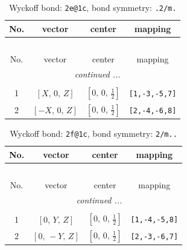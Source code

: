 \documentclass[fleqn,8pt]{jsarticle}
\begin{document}
\renewcommand{\arraystretch}{1.2}
\begin{longtable}{cccc}
\caption{Wyckoff bond: {\tt 2e@1c}, bond symmetry: {\tt .2/m.}}
 \\
 \hline \hline
No. & vector & center & mapping \\ \hline \endfirsthead

\multicolumn{3}{l}{\tablename\ \thetable{}} \\
 \hline \hline
No. & vector & center & mapping \\ \hline \endhead

 \hline \hline
\multicolumn{3}{r}{\footnotesize\it continued ...} \\ \endfoot

 \hline \hline
\multicolumn{3}{r}{} \\ \endlastfoot

1 & $\left[ X,\, 0,\, Z \right]$ & $\left[ 0,\, 0,\, \frac{1}{2} \right]$ & {\tt [1,-3,-5,7]} \\ \hline
2 & $\left[ - X,\, 0,\, Z \right]$ & $\left[ 0,\, 0,\, \frac{1}{2} \right]$ & {\tt [2,-4,-6,8]} \\
\end{longtable}
\renewcommand{\arraystretch}{1.2}
\begin{longtable}{cccc}
\caption{Wyckoff bond: {\tt 2f@1c}, bond symmetry: {\tt 2/m..}}
 \\
 \hline \hline
No. & vector & center & mapping \\ \hline \endfirsthead

\multicolumn{3}{l}{\tablename\ \thetable{}} \\
 \hline \hline
No. & vector & center & mapping \\ \hline \endhead

 \hline \hline
\multicolumn{3}{r}{\footnotesize\it continued ...} \\ \endfoot

 \hline \hline
\multicolumn{3}{r}{} \\ \endlastfoot

1 & $\left[ 0,\, Y,\, Z \right]$ & $\left[ 0,\, 0,\, \frac{1}{2} \right]$ & {\tt [1,-4,-5,8]} \\ \hline
2 & $\left[ 0,\, - Y,\, Z \right]$ & $\left[ 0,\, 0,\, \frac{1}{2} \right]$ & {\tt [2,-3,-6,7]} \\
\end{longtable}
\renewcommand{\arraystretch}{1.2}
\end{document}
